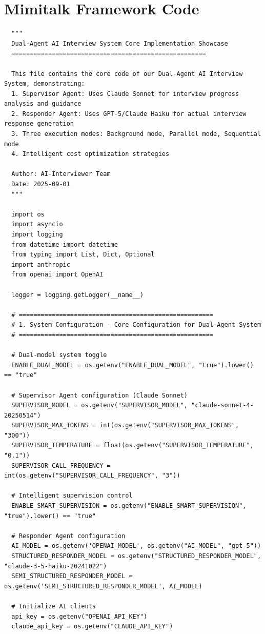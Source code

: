 \documentclass[sigchi,nonacm,manuscript]{acmart}
\begin{document}
\section{Mimitalk Framework Code}
\label{sec:mimitalk_framework_code}

\begin{lstlisting}
  """
  Dual-Agent AI Interview System Core Implementation Showcase
  =====================================================

  This file contains the core code of our Dual-Agent AI Interview System, demonstrating:
  1. Supervisor Agent: Uses Claude Sonnet for interview progress analysis and guidance
  2. Responder Agent: Uses GPT-5/Claude Haiku for actual interview response generation
  3. Three execution modes: Background mode, Parallel mode, Sequential mode
  4. Intelligent cost optimization strategies

  Author: AI-Interviewer Team
  Date: 2025-09-01
  """

  import os
  import asyncio
  import logging
  from datetime import datetime
  from typing import List, Dict, Optional
  import anthropic
  from openai import OpenAI

  logger = logging.getLogger(__name__)

  # =====================================================
  # 1. System Configuration - Core Configuration for Dual-Agent System
  # =====================================================

  # Dual-model system toggle
  ENABLE_DUAL_MODEL = os.getenv("ENABLE_DUAL_MODEL", "true").lower() == "true"

  # Supervisor Agent configuration (Claude Sonnet)
  SUPERVISOR_MODEL = os.getenv("SUPERVISOR_MODEL", "claude-sonnet-4-20250514")
  SUPERVISOR_MAX_TOKENS = int(os.getenv("SUPERVISOR_MAX_TOKENS", "300"))
  SUPERVISOR_TEMPERATURE = float(os.getenv("SUPERVISOR_TEMPERATURE", "0.1"))
  SUPERVISOR_CALL_FREQUENCY = int(os.getenv("SUPERVISOR_CALL_FREQUENCY", "3"))

  # Intelligent supervision control
  ENABLE_SMART_SUPERVISION = os.getenv("ENABLE_SMART_SUPERVISION", "true").lower() == "true"

  # Responder Agent configuration
  AI_MODEL = os.getenv('OPENAI_MODEL', os.getenv("AI_MODEL", "gpt-5"))
  STRUCTURED_RESPONDER_MODEL = os.getenv("STRUCTURED_RESPONDER_MODEL", "claude-3-5-haiku-20241022")
  SEMI_STRUCTURED_RESPONDER_MODEL = os.getenv('SEMI_STRUCTURED_RESPONDER_MODEL', AI_MODEL)

  # Initialize AI clients
  api_key = os.getenv("OPENAI_API_KEY")
  claude_api_key = os.getenv("CLAUDE_API_KEY")


\end{lstlisting}
\end{document}
